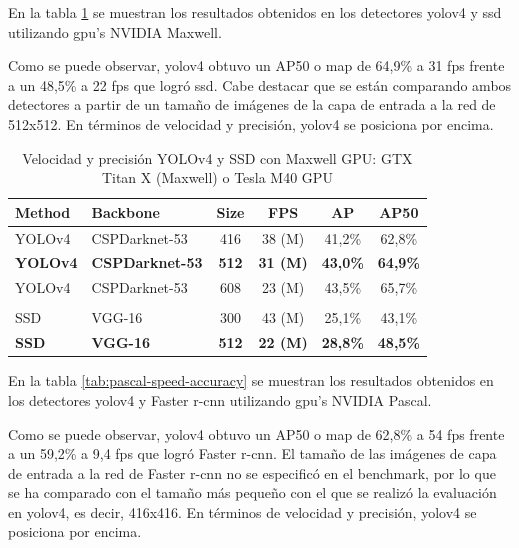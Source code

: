 En la tabla \ref{tab:maxwell-speed-accuracy} se muestran los resultados obtenidos en los detectores \gls{yolov4} y \gls{ssd} utilizando \gls{gpu}'s NVIDIA Maxwell.

Como se puede observar, \gls{yolov4} obtuvo un AP50 o \gls{map} de 64,9\% a 31 \gls{fps} frente a un 48,5\% a 22 \gls{fps} que logró \gls{ssd}. Cabe destacar que se están comparando ambos detectores a partir de un tamaño de imágenes de la capa de entrada a la red de 512x512. En términos de velocidad y precisión, \gls{yolov4} se posiciona por encima.

\begin{table}[ht]
\centering
\caption{Velocidad y precisión YOLOv4 y SSD con Maxwell GPU: GTX Titan X (Maxwell) o Tesla M40 GPU \cite{bochkovskiy2020yolov4} \cite{Liu_2016}}
\label{tab:maxwell-speed-accuracy}
\begin{tabular}{llcccc}
\hline
\textbf{Method} & \textbf{Backbone}      & \textbf{Size} & \textbf{FPS}    & \textbf{AP}     & \textbf{AP50}   \\ \hline
YOLOv4          & CSPDarknet-53          & 416           & 38 (M)          & 41,2\%          & 62,8\%          \\
\textbf{YOLOv4} & \textbf{CSPDarknet-53} & \textbf{512}  & \textbf{31 (M)} & \textbf{43,0\%} & \textbf{64,9\%} \\
YOLOv4          & CSPDarknet-53          & 608           & 23 (M)          & 43,5\%          & 65,7\%          \\
                &                        &               &                 &                 &                 \\
SSD             & VGG-16                 & 300           & 43 (M)          & 25,1\%          & 43,1\%          \\
\textbf{SSD}    & \textbf{VGG-16}        & \textbf{512}  & \textbf{22 (M)} & \textbf{28,8\%} & \textbf{48,5\%} \\ \hline
\end{tabular}
\end{table}

En la tabla \ref{tab:pascal-speed-accuracy} se muestran los resultados obtenidos en los detectores \gls{yolov4} y Faster \gls{r-cnn} utilizando \gls{gpu}'s NVIDIA Pascal.

Como se puede observar, \gls{yolov4} obtuvo un AP50 o \gls{map} de 62,8\% a 54 \gls{fps} frente a un 59,2\% a 9,4 \gls{fps} que logró Faster \gls{r-cnn}. El tamaño de las imágenes de capa de entrada a la red de Faster \gls{r-cnn} no se especificó en el benchmark, por lo que se ha comparado con el tamaño más pequeño con el que se realizó la evaluación en \gls{yolov4}, es decir, 416x416. En términos de velocidad y precisión, \gls{yolov4} se posiciona por encima. 


